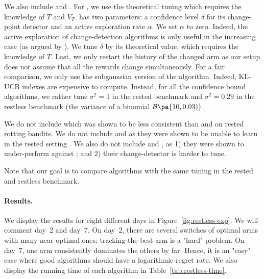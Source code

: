 We also include \EXPS\citep{auer2002nonstochastic} and \GLRUCB \citep{besson2019generalized}.  For \EXPS, we use the theoretical tuning which requires the knowledge of $T$ and $V_T$. \GLRUCB has two parameters: a confidence level $\delta$ for its change-point detector and an active exploration rate $\alpha$. We set $\alpha$ to zero. Indeed, the active exploration of change-detection algorithms is only useful in the increasing case (as argued by \citet{cao2019nearly}). We tune $\delta$ by its theoretical value, which requires the knowledge of $T$. Last, we only restart the history of the changed arm as our setup does not assume that all the rewards change simultaneously. For a fair comparison, we only use the subgaussian version of the algorithm. Indeed, KL-UCB indexes are expensive to compute. Instead, for all the confidence bound algorithms, we rather tune $\sigma^2 = 1$ in the rested benchmark and $\sigma^2 = 0.29$ in the restless benchmark (the variance of a binomial $\mathcal{B}\pa{10,0.03)}$.  

We do not include \SWA \citep{levine2017rotting} which was shown to be less consistent than \FEWA and \RAWUCB on rested rotting bandits. We do not include \SWUCB and \DUCB as they were shown to be unable to learn in the rested setting  \citep{levine2017rotting, seznec2019rotting}. We also do not include \CUSUMUCB \citep{liu2018change-detection} and \MUCB \citep{cao2019nearly}, as 1) they were shown to under-perform against \GLRUCB \citep{besson2019generalized}; and 2) their change-detector is harder to tune.

Note that our goal is to compare algorithms with the same tuning in the rested and restless benchmark. 

\paragraph{Results.} We display the results for eight different days in Figure~\ref{fig:restless-exp}.%
We will comment day~2 and day~7. On day~2, there are several switches of optimal arms with many near-optimal ones: tracking the best arm is a "hard" problem. On day~7, one arm consistently dominates the others by far. Hence, it is an "easy" case where good algorithms should have a logarithmic regret rate. We also display the running time of each algorithm in Table~\ref{tab:restless-time}.

